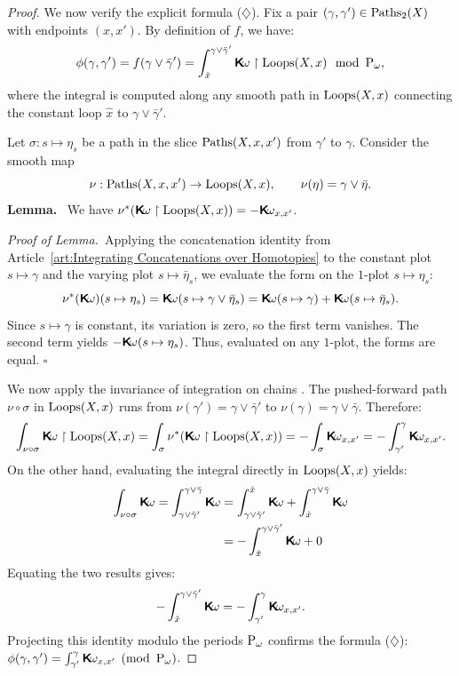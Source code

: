 \documentclass[10pt,reqno,letterpaper,twoside]{amsbook}
\begin{document}
\begin{proof}
    We now verify the explicit formula ($\diamondsuit$).
    Fix a pair $(\gamma, \gamma') \in \operatorname{Paths}_2(X)$ with endpoints $(x,x')$.
    By definition of $f$,
    we have:
    \[
      \phi(\gamma,\gamma') = f(\gamma \vee \bar\gamma') = \int_{\hat{x}}^{\gamma \vee \bar\gamma'} \boldsymbol{\mathsf{K}}\!\omega \restriction \operatorname{Loops}(X,x) \mod {\operatorname{P}_\omega},
      \]
    where the integral is computed along any smooth path in $\operatorname{Loops}(X,x)$ connecting the constant loop $\hat{x}$ to $\gamma \vee \bar\gamma'$.
    
    Let $\sigma : s \mapsto \eta_s$ be a path in the slice $\operatorname{Paths}(X,x,x')$ from $\gamma'$ to $\gamma$.
    Consider the smooth map
    \[
      \nu : \operatorname{Paths}(X,x,x') \to \operatorname{Loops}(X,x),
      \qquad
      \nu(\eta) = \gamma \vee \bar\eta.
      \]
    \textbf{Lemma.}~ We have $\nu^*(\boldsymbol{\mathsf{K}}\!\omega \restriction \operatorname{Loops}(X,x)) = - \boldsymbol{\mathsf{K}}\!\omega_{x,x'}$.
    
    \textit{Proof of Lemma.}~Applying the concatenation identity from Article~\ref{art:Integrating Concatenations over Homotopies} to the constant plot $s \mapsto \gamma$ and the varying plot $s \mapsto \bar\eta_s$,
    we evaluate the form on the $1$-plot $s \mapsto \eta_s$:
    \[
      \nu^*(\boldsymbol{\mathsf{K}}\!\omega)(s \mapsto \eta_s) = \boldsymbol{\mathsf{K}}\!\omega(s \mapsto \gamma \vee \bar\eta_s) = \boldsymbol{\mathsf{K}}\!\omega(s \mapsto \gamma) + \boldsymbol{\mathsf{K}}\!\omega(s \mapsto \bar\eta_s).
      \]
    Since $s \mapsto \gamma$ is constant,
    its variation is zero,
    so the first term vanishes.
    The second term yields $- \boldsymbol{\mathsf{K}}\!\omega(s \mapsto \eta_s)$.
    Thus,
    evaluated on any $1$-plot,
    the forms are equal. \hfill$\square$
    
    We now apply the invariance of integration on chains \cite[]{PIZ13}.
    The pushed-forward path $\nu \circ \sigma$ in $\operatorname{Loops}(X,x)$ runs from $\nu(\gamma') = \gamma \vee \bar\gamma'$ to $\nu(\gamma) = \gamma \vee \bar\gamma$.
    Therefore:
    \[
      \int_{\nu \circ \sigma} \boldsymbol{\mathsf{K}}\!\omega \restriction \operatorname{Loops}(X,x) = \int_\sigma \nu^*(\boldsymbol{\mathsf{K}}\!\omega \restriction \operatorname{Loops}(X,x)) = - \int_\sigma \boldsymbol{\mathsf{K}}\!\omega_{x,x'} = - \int_{\gamma'}^\gamma \boldsymbol{\mathsf{K}}\!\omega_{x,x'}.
      \]
    On the other hand,
    evaluating the integral directly in $\operatorname{Loops}(X,x)$ yields:
    \begin{align*}
      \int_{\nu \circ \sigma} \boldsymbol{\mathsf{K}}\!\omega = \int_{\gamma \vee \bar\gamma'}^{\gamma \vee \bar\gamma} \boldsymbol{\mathsf{K}}\!\omega & = \int_{\gamma \vee \bar\gamma'}^{\hat{x}} \boldsymbol{\mathsf{K}}\!\omega + \int_{\hat{x}}^{\gamma \vee \bar\gamma} \boldsymbol{\mathsf{K}}\!\omega \\
      &  = - \int_{\hat{x}}^{\gamma \vee \bar\gamma'} \boldsymbol{\mathsf{K}}\!\omega + 0
    \end{align*}
    Equating the two results gives:
    \[
      - \int_{\hat{x}}^{\gamma \vee \bar\gamma'} \boldsymbol{\mathsf{K}}\!\omega = - \int_{\gamma'}^\gamma \boldsymbol{\mathsf{K}}\!\omega_{x,x'}.
      \]
    Projecting this identity modulo the periods $\operatorname{P}_\omega$ confirms the formula ($\diamondsuit$):
    $\phi(\gamma,\gamma') = \int_{\gamma'}^\gamma \boldsymbol{\mathsf{K}}\!\omega_{x,x'} \pmod {\operatorname{P}_\omega}$.
    

\end{proof}
\end{document}
